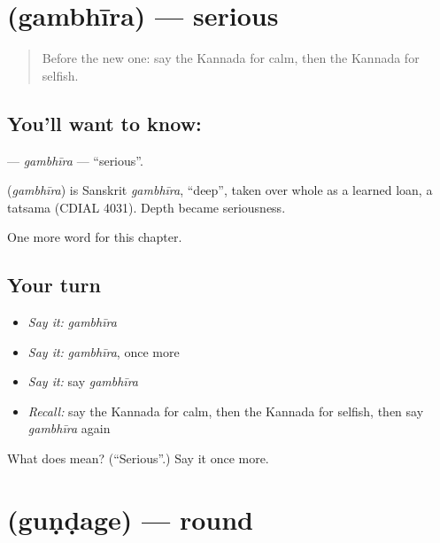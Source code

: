 \section[\texorpdfstring{\kn{ಗಂಭೀರ} (gambhīra)}{ಗಂಭೀರ (gambhīra)}]{ (gambhīra) — serious}

\label{lesson:KA-C255-gambhira}



\begin{quote}
Before the new one: say the Kannada for calm, then the Kannada for selfish.
\end{quote}

\subsection*{You'll want to know: }
\textbf{} — \emph{gambhīra} — \textquotedblleft{}serious\textquotedblright{}.

\begin{cousinweb}
\textbf{} (\emph{gambhīra}) is Sanskrit \emph{gambhīra}, \textquotedblleft{}deep\textquotedblright{}, taken over whole as a learned loan, a tatsama (CDIAL 4031). Depth became seriousness.
\end{cousinweb}

\begin{grammarlens}[title={What you've built}]
One more word for this chapter.
\end{grammarlens}

\subsection*{Your turn}
\begin{itemize}
\raggedright
  \item \emph{Say it:} \emph{gambhīra}
  \item \emph{Say it:} \emph{gambhīra}, once more
  \item \emph{Say it:} say \emph{gambhīra}
  \item \emph{Recall:} say the Kannada for calm, then the Kannada for selfish, then say \emph{gambhīra} again
\end{itemize}

\begin{tcolorbox}[breakable,colback=teal!4,colframe=teal!35!black,title={Before you move on}]
What does  mean? (\textquotedblleft{}Serious\textquotedblright{}.) Say it once more.
\end{tcolorbox}
\section[\texorpdfstring{\kn{ಗುಂಡಗೆ} (guṇḍage)}{ಗುಂಡಗೆ (guṇḍage)}]{ (guṇḍage) — round}

